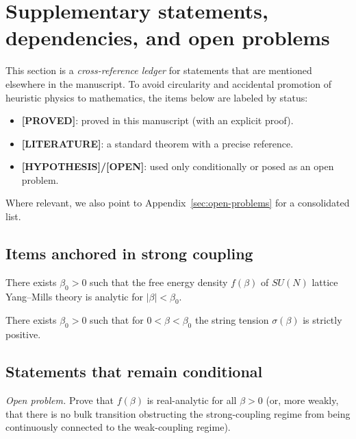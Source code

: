 \section{Supplementary statements, dependencies, and open problems}
\label{sec:supplementary-theorems}

This section is a \emph{cross-reference ledger} for statements that are mentioned elsewhere in the manuscript.
To avoid circularity and accidental promotion of heuristic physics to mathematics, the items below are labeled by status:
\begin{itemize}
	\item \textbf{[PROVED]}: proved in this manuscript (with an explicit proof).
	\item \textbf{[LITERATURE]}: a standard theorem with a precise reference.
	\item \textbf{[HYPOTHESIS]/[OPEN]}: used only conditionally or posed as an open problem.
\end{itemize}
Where relevant, we also point to Appendix~\ref{sec:open-problems} for a consolidated list.

\subsection{Items anchored in strong coupling}

\begin{theorem}
\label{thm:convex-analytic}
There exists $\beta_0>0$ such that the free energy density $f(\beta)$ of $SU(N)$ lattice Yang--Mills theory is analytic for $|\beta|<\beta_0$.
\end{theorem}

\begin{theorem}
\label{thm:sigma-positivity-final}
There exists $\beta_0>0$ such that for $0<\beta<\beta_0$ the string tension $\sigma(\beta)$ is strictly positive.
\end{theorem}

\subsection{Statements that remain conditional}

\begin{theorem}
\label{thm:global_analyticity_supp}
\emph{Open problem.} Prove that $f(\beta)$ is real-analytic for all $\beta>0$ (or, more weakly, that there is no bulk transition obstructing the strong-coupling regime from being continuously connected to the weak-coupling regime).
\end{theorem}

